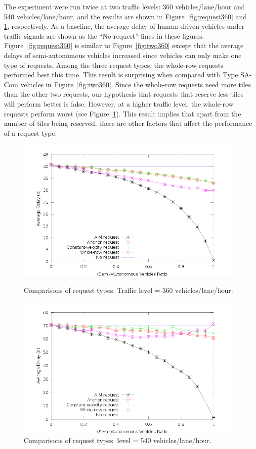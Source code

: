 The experiment were run twice at two traffic levels: 360
vehicles/lane/hour and 540 vehicles/lane/hour, and the results are
shown in Figure~\ref{fig:request360} and \ref{fig:request540},
respectively.  As a baseline, the average delay of human-driven
vehicles under traffic signals are shown as the ``No request'' lines
in these figures.  Figure~\ref{fig:request360} is similar to
Figure~\ref{fig:two360} except that the average delays of
semi-autonomous vehicles increased since vehicles can only make one
type of requests. Among the three request types, the whole-row
requests performed best this time.  This result is surprising when
compared with Type SA-Com vehicles in Figure~\ref{fig:two360}.  Since
the whole-row requests need more tiles than the other two requests,
our hypothesis that requests that reserve less tiles will perform
better is false.  However, at a higher traffic level, the whole-row
requests perform worst (see Figure~\ref{fig:request540}).  This result
implies that apart from the number of tiles being reserved, there are
other factors that affect the performance of a request type.

\begin{figure}
\centering
\includegraphics[width=0.8\columnwidth]{figures/figure_2.png}
\caption{Comparisons of request types.
Traffic level = 360 vehicles/lane/hour.}
\label{fig:request360}

\mbox{}

\centering
\includegraphics[width=0.8\columnwidth]{figures/figure_5.png}
\caption{Comparisons of request types.
level = 540 vehicles/lane/hour.}
\label{fig:request540}
\end{figure}






